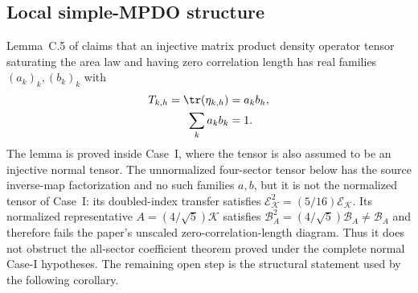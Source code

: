 \subsection{Local simple-MPDO structure}

\begin{remark}
    \label{rem:mpdo_sal_zcl_rank_one_normalization_boundary}
    Lemma~C.5 of
    \cite[Appendix~C.2, lines~1484--1499]{Cirac2016MPDO_arXiv} claims that an
    injective matrix product density operator tensor saturating the area law
    and having zero correlation length has real families $(a_k)_k,(b_k)_k$ with
    \begin{align}
        T_{k,h}=\tr(\eta_{k,h}) & =a_kb_h, \notag \\
        \sum_k a_kb_k           & =1. \notag
    \end{align}
    The lemma is proved inside Case~I, where the tensor is also assumed to be
    an injective normal tensor. The unnormalized four-sector tensor below has the source
    inverse-map factorization and no such families $a,b$, but it is not the
    normalized tensor of Case~I: its doubled-index transfer satisfies
    $\mathcal E_{\mathcal K}^2=(5/16)\mathcal E_{\mathcal K}$. Its normalized
    representative $A=(4/\sqrt5)\mathcal K$ satisfies
    $\mathcal B_A^2=(4/\sqrt5)\mathcal B_A\ne\mathcal B_A$ and therefore fails
    the paper's unscaled zero-correlation-length diagram. Thus it does not
    obstruct the all-sector coefficient theorem proved under the complete
    normal Case-I hypotheses. The remaining open step is the structural
    statement used by the following corollary.
\end{remark}

